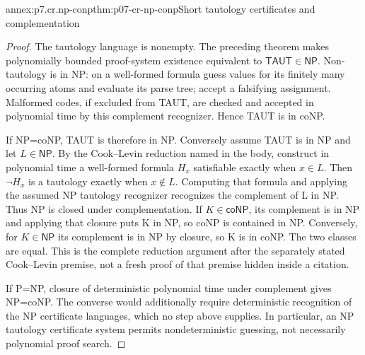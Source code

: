 \begin{annexitem}{annex:p7.cr.np-conp}{thm:p07-cr-np-conp}{Short tautology certificates and complementation}
\begin{proof}
The tautology language is nonempty. The preceding theorem makes
polynomially bounded proof-system existence equivalent to
\(\mathsf{TAUT}\in\mathsf{NP}\). Non-tautology is in NP:
on a well-formed formula guess values for its finitely many
occurring atoms and evaluate its parse tree; accept a falsifying
assignment. Malformed codes, if excluded from TAUT, are checked
and accepted in polynomial time by this complement recognizer.
Hence TAUT is in coNP.

If NP=coNP, TAUT is therefore in NP. Conversely assume TAUT is
in NP and let \(L\in\mathsf{NP}\). By the Cook--Levin
reduction named in the body, construct in polynomial time a
well-formed formula \(H_x\) satisfiable exactly when \(x\in L\).
Then \(\neg H_x\) is a tautology exactly when \(x\notin L\).
Computing that formula and applying the assumed NP tautology
recognizer recognizes the complement of L in NP. Thus NP is
closed under complementation. If \(K\in\mathsf{coNP}\), its
complement is in NP and applying that closure puts K in NP,
so coNP is contained in NP. Conversely, for \(K\in\mathsf{NP}\)
its complement is in NP by closure, so K is in coNP. The two
classes are equal. This is the complete reduction argument after
the separately stated Cook--Levin premise, not a fresh proof of
that premise hidden inside a citation.

If P=NP, closure of deterministic polynomial time under complement
gives NP=coNP. The converse would additionally require deterministic
recognition of the NP certificate languages, which no step above
supplies. In particular, an NP tautology certificate system permits
nondeterministic guessing, not necessarily polynomial proof search.
\end{proof}
\end{annexitem}

